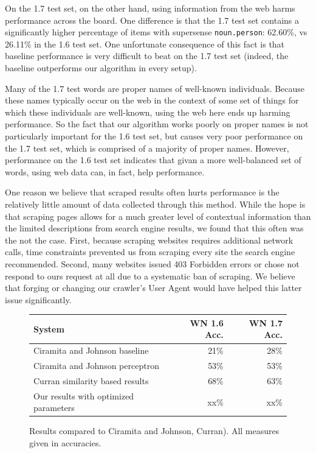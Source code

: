 \documentclass{article}
\begin{document}
On the 1.7 test set, on the other hand, using information from the web harms performance across the board.
One difference is that the 1.7 test set contains a significantly higher percentage of items with supersense {\tt noun.person}: 62.60\%, vs 26.11\% in the 1.6 test set.
One unfortunate consequence of this fact is that baseline performance is very difficult to beat on the 1.7 test set (indeed, the baseline outperforms our algorithm in every setup).

Many of the 1.7 test words are proper names of well-known individuals.
Because these names typically occur on the web in the context of some set of things for which these individuals are well-known, using the web here ends up harming performance.
So the fact that our algorithm works poorly on proper names is not particularly important for the 1.6 test set, but causes very poor performance on the 1.7 test set, which is comprised of a majority of proper names.
However, performance on the 1.6 test set indicates that givan a more well-balanced set of words, using web data can, in fact, help performance.

One reason we believe that scraped results often hurts performance is the relatively little amount of data collected through this method.
While the hope is that scraping pages allows for a much greater level of contextual information than the limited descriptions from search engine results, we found that this often was the not the case.
First, because scraping websites requires additional network calls, time constraints prevented us from scraping every site the search engine recommended.
Second, many websites issued 403 Forbidden errors or chose not respond to ours request at all due to a systematic ban of scraping.
We believe that forging or changing our crawler's User Agent would have helped this latter issue significantly.

\begin{figure}[hbtp]
\begin{center}
\begin{tabular}{|l|r|r|}
    \hline
    \bf{System} & \bf{WN 1.6 Acc.} & \bf{WN 1.7 Acc.}\\
    \hline
    Ciramita and Johnson baseline & 21\% & 28\%\\
    Ciramita and Johnson perceptron & 53\% & 53\%\\
    Curran similarity based results & 68\% & 63\%\\
    Our results with optimized parameters & xx\% & xx\%\\
    \hline
\end{tabular}
\caption{Results compared to Ciramita and Johnson, Curran).  All measures given in accuracies.}
\label{fig:compareresults}
\end{center}
\end{figure}
\end{document}
